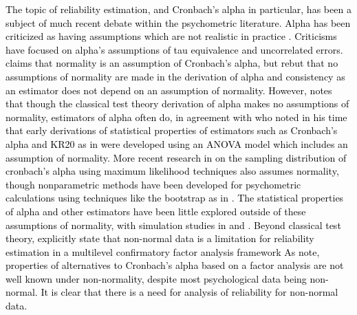 \documentclass[12pt,epsfig]{article}
\newcommand{\changed}[1]{\textcolor{black}{#1}}
\begin{document}
\changed{The topic of reliability estimation, and Cronbach's alpha in particular, has been a subject of much recent debate within the psychometric literature. Alpha has been criticized as having assumptions which are not realistic in practice \citep{Schmitt1996,Sijtsma2009, Mcneish2017}.  Criticisms have focused on alpha's assumptions of tau equivalence and uncorrelated errors. \cite{Mcneish2017} claims that normality is an assumption of Cronbach's alpha, but \cite{Raykov2019} rebut that no assumptions of normality are made in the derivation of alpha and consistency as an estimator does not depend on an assumption of normality. However, \cite{Zumbo1999} notes that though the classical test theory derivation of alpha makes no assumptions of normality, estimators of alpha often do, in agreement with \cite{Bay1973} who noted in his time that early derivations of statistical properties of estimators such as Cronbach's alpha and KR20 as in \cite{Feldt1965} were developed using an ANOVA model which includes an assumption of normality. More recent research in \cite{Zyl2000} on the sampling distribution of cronbach's alpha using maximum likelihood techniques also assumes normality,  though nonparametric methods have been developed for psychometric calculations using techniques like the bootstrap as in \cite{Raykov1998}. The statistical properties of alpha and other estimators have been little explored outside of these assumptions of normality, with simulation studies in \cite{Sheng2012} and \cite{Zimmerman1993}. Beyond classical test theory, \cite{Geldhof2014} explicitly state that non-normal data is a limitation for reliability estimation in a multilevel confirmatory factor analysis framework As \cite{Zinbarg2006} note, properties of alternatives to Cronbach's alpha based on a factor analysis are not well known under non-normality, despite most psychological data being non-normal. It is clear that there is a need for analysis of reliability for non-normal data.}
\end{document}
